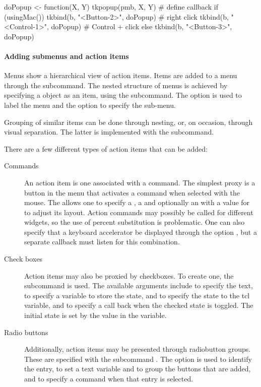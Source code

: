 \begin{Schunk}
\begin{Sinput}
 doPopup <- function(X, Y) tkpopup(pmb, X, Y) # define callback
 if (usingMac()) {
   tkbind(b, "<Button-2>", doPopup)      # right click
   tkbind(b, "<Control-1>", doPopup)     # Control + click
 } else {
   tkbind(b, "<Button-3>", doPopup)
 }
\end{Sinput}
\end{Schunk}


\paragraph{Adding submenus and action items}
Menus show a hierarchical view of action items. Items are added to a
menu through the  subcommand.  The nested
structure of menus is achieved by specifying a  object as
an item, using the  subcommand. The
option  is used to label the menu and the 
option to specify the sub-menu.

Grouping of similar items can be done through nesting, or, on occasion,
through visual separation. The latter is implemented with the  subcommand.


There are a few different types of action items that can be added:
 
\begin{description}
\item[Commands] An action item is one associated with a command. The
  simplest proxy is a button in the menu that activates a command when
  selected with the mouse. The  allows
  one to specify a , a  and optionally an
   with a value for  to adjust its
  layout. Action commands may %
  possibly be called for different widgets, so the use of percent
  substitution is problematic. One can also specify that a keyboard
  accelerator be displayed through the option , but
  a separate callback must listen for this combination.

\item[Check boxes] Action items may also be proxied by checkboxes. To
  create one, the subcommand  is
  used. The available arguments include  to specify the
  text,  to specify a \TCL{} variable to store the state,
   and  to specify the state to the tcl
  variable, and  to specify a call back when the checked
  state is toggled. The initial state is set by the value in the
  \TCL\/ variable.

\item[Radio buttons] Additionally, action items may be presented
  through radiobutton groups. These are specified with the subcommand
  . The  option is
  used to identify the entry,  to set a text variable
  and to group the buttons that are added, and  to
  specify a command when that entry is selected.
\end{description}

